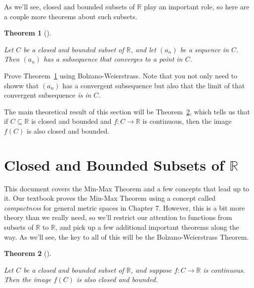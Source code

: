\documentclass[
  letterpaper,
  DIV=11,
  numbers=noendperiod]{scrreprt}
\def\R{\mathbb R}
\theoremstyle{plain}
\newtheorem{theorem}{Theorem}[chapter]
\theoremstyle{definition}
\theoremstyle{plain}
\theoremstyle{plain}
\theoremstyle{definition}
\theoremstyle{definition}
\theoremstyle{remark}
\begin{document}
As we'll see, closed and bounded subsets of \(\mathbb R\) play an
important role, so here are a couple more theorems about such subsets.

\begin{theorem}[]\protect\hypertarget{thm-sequential-compactness}{}\label{thm-sequential-compactness}

Let \(C\) be a closed and bounded subset of \(\mathbb R\), and let
\((a_n)\) be a sequence in \(C\). Then \((a_n)\) has a subsequence that
converges to a point in \(C\).

\end{theorem}

Prove Theorem~\ref{thm-sequential-compactness} using
Bolzano-Weierstrass. Note that you not only need to showw that \((a_n)\)
has a convergent subsequence but also that the limit of that convergent
subsequence \emph{is in \(C\)}.

The main theoretical result of this section will be
Theorem~\ref{thm-image-of-compact-is-compact}, which tells us that if
\(C\subseteq\R\) is closed and bounded and \(f:C\rightarrow\R\) is
continuous, then the image \(f(C)\) is also closed and bounded.

\section{\texorpdfstring{Closed and Bounded Subsets of
\(\R\)}{Closed and Bounded Subsets of \textbackslash R}}\label{closed-and-bounded-subsets-of-r}

This document covers the Min-Max Theorem and a few concepts that lead up
to it. Our textbook proves the Min-Max Theorem using a concept called
\emph{compactness} for general metric spaces in Chapter 7. However, this
is a bit more theory than we really need, so we'll restrict our
attention to functions from subsets of \(\mathbb R\) to \(\mathbb R\),
and pick up a few additional important theorems along the way. As we'll
see, the key to all of this will be the Bolzano-Weierstrass Theorem.

\begin{theorem}[]\protect\hypertarget{thm-image-of-compact-is-compact}{}\label{thm-image-of-compact-is-compact}

Let \(C\) be a closed and bounded subset of \(\mathbb R\), and suppose
\(f:C\rightarrow\mathbb R\) is continuous. Then the image \(f(C)\) is
also closed and bounded.

\end{theorem}
\end{document}
